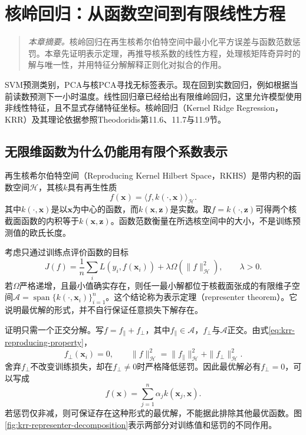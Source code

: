\chapter{核岭回归：从函数空间到有限线性方程}
\label{chap:krr}
\begin{quote}\small
\textit{本章摘要。}核岭回归在再生核希尔伯特空间中最小化平方误差与函数范数惩罚。本章先证明表示定理，再推导核系数的线性方程，处理核矩阵奇异时的解与唯一性，并用特征分解解释正则化对拟合的作用。
\end{quote}

SVM预测类别，PCA与核PCA寻找无标签表示。现在回到实数回归，例如根据当前读数预测下一小时温度。线性回归章已经给出有限维岭回归，这里允许模型使用非线性特征，且不显式存储特征坐标。核岭回归（Kernel Ridge Regression，KRR）及其理论依据参照Theodoridis第11.6、11.7与11.9节\cite{theodoridis2015ml}。

\section{无限维函数为什么仍能用有限个系数表示}
再生核希尔伯特空间（Reproducing Kernel Hilbert Space，RKHS）是带内积的函数空间$\mathcal H$，其核$k$具有再生性质
\begin{equation}
 f(\bm x)=\langle f,k(\cdot,\bm x)\rangle_{\mathcal H}.
 \label{eq:krr-reproducing-property}
\end{equation}
其中$k(\cdot,\bm x)$是以$\bm x$为中心的函数，而$k(\bm x,\bm z)$是实数。取$f=k(\cdot,\bm z)$可得两个核截面函数的内积等于$k(\bm x,\bm z)$。函数范数衡量在所选核空间中的大小，不是训练预测值的欧氏长度。

考虑只通过训练点评价函数的目标
\begin{equation}
 J(f)=\frac1n\sum_i L(y_i,f(\bm x_i))
 +\lambda\Omega(\|f\|_{\mathcal H}^2),\qquad\lambda>0.
 \label{eq:krr-representer-objective}
\end{equation}
若$\Omega$严格递增，且最小值确实存在，则任一最小解都位于核截面张成的有限维子空间$\mathcal A=\operatorname{span}\{k(\cdot,\bm x_i)\}_{i=1}^n$。这个结论称为表示定理（representer theorem）。它说明最优解的形式，并不自行保证任意损失下解存在。

证明只需一个正交分解。写$f=f_{\parallel}+f_{\perp}$，其中$f_{\parallel}\in\mathcal A$，$f_{\perp}$与$\mathcal A$正交。由式\eqref{eq:krr-reproducing-property}，
\begin{equation}
 f_{\perp}(\bm x_i)=0,\qquad
 \|f\|_{\mathcal H}^2=\|f_{\parallel}\|_{\mathcal H}^2+\|f_{\perp}\|_{\mathcal H}^2.
\end{equation}
舍弃$f_{\perp}$不改变训练损失，却在$f_{\perp}\ne0$时严格降低惩罚。因此最优解必有$f_{\perp}=0$，可以写成
\begin{equation}
 f(\bm x)=\sum_{j=1}^n\alpha_j k(\bm x_j,\bm x).
 \label{eq:krr-representer-expansion}
\end{equation}
若惩罚仅非减，则可保证存在这种形式的最优解，不能据此排除其他最优函数。图\ref{fig:krr-representer-decomposition}表示两部分对训练值和惩罚的不同作用。

